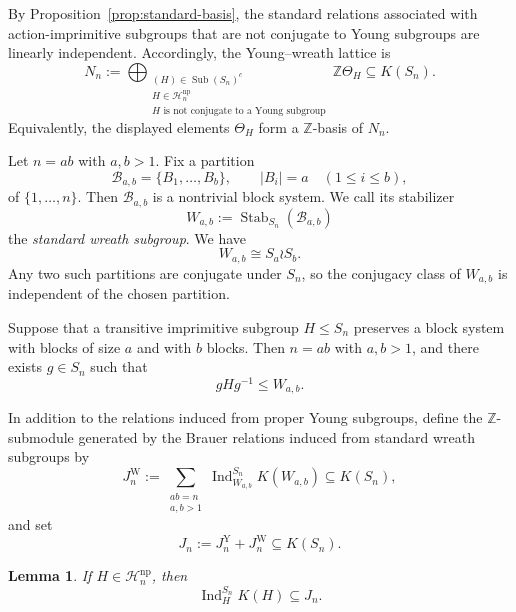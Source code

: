\documentclass[a4paper,11pt]{article}
\numberwithin{equation}{section}
\newtheorem{lemma}[theorem]{Lemma}
\newcommand{\Z}{\mathbb{Z}}
\newcommand{\Ind}{\operatorname{Ind}}
\begin{document}
By Proposition~\ref{prop:standard-basis}, the standard relations associated
with action-imprimitive subgroups that are not conjugate to Young subgroups
are linearly independent. Accordingly, the Young--wreath lattice is
\begin{equation}\label{eq:nonprimitive-lattice}
  N_n
  :=
  \bigoplus_{\substack{
    (H)\in\operatorname{Sub}(S_n)^c\\
    H\in\mathcal H_n^{\mathrm{np}}\\
    H\text{ is not conjugate to a Young subgroup}
  }}
  \Z\Theta_H
  \subseteq K(S_n).
\end{equation}
Equivalently, the displayed elements $\Theta_H$ form a $\Z$-basis of $N_n$.


Let $n=ab$ with $a,b>1$. Fix a partition
\[
  \mathcal B_{a,b}
  =
  \{B_1,\ldots,B_b\},
  \qquad
  |B_i|=a
  \quad
  (1\le i\le b),
\]
of $\{1,\ldots,n\}$. Then $\mathcal B_{a,b}$ is a nontrivial block system.
We call its stabilizer
\[
  W_{a,b}
  :=
  \operatorname{Stab}_{S_n}(\mathcal B_{a,b})
\]
the \emph{standard wreath subgroup}. We have
\[
  W_{a,b}\cong S_a\wr S_b.
\]
Any two such partitions are conjugate under $S_n$, so the conjugacy class of
$W_{a,b}$ is independent of the chosen partition.

Suppose that a transitive imprimitive subgroup $H\le S_n$ preserves a block
system with blocks of size $a$ and with $b$ blocks. Then $n=ab$ with $a,b>1$,
and there exists $g\in S_n$ such that
\[
  gHg^{-1}\le W_{a,b}.
\]

In addition to the relations induced from proper Young subgroups, define the
$\Z$-submodule generated by the Brauer relations induced from standard wreath
subgroups by
\[
  J_n^{\mathrm W}
  :=
  \sum_{\substack{ab=n\\a,b>1}}
  \Ind_{W_{a,b}}^{S_n}K(W_{a,b})
  \subseteq K(S_n),
\]
and set
\begin{equation}\label{eq:young-wreath-induced-lattice}
  J_n
  :=
  J_n^{\mathrm Y}+J_n^{\mathrm W}
  \subseteq K(S_n).
\end{equation}

\begin{lemma}\label{lem:all-nonprimitive-induction}
If $H\in\mathcal H_n^{\mathrm{np}}$, then
\[
  \Ind_H^{S_n}K(H)\subseteq J_n.
\]
\end{lemma}
\end{document}
